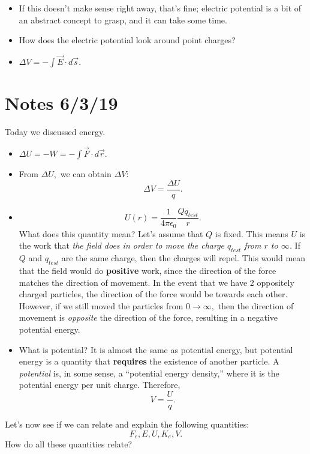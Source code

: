 \documentclass[12pt]{extreport}
\begin{document}
\begin{itemize}
\begin{itemize}
				\item If this doesn't make sense right away, that's fine; electric potential is a bit of an abstract concept to grasp, and it can take some time.

				\item How does the electric potential look around point charges?

				\item $\Delta V = -\int \vec E \cdot d\vec s.$

			\end{itemize}

	\end{itemize}

\section{Notes 6/3/19}
	Today we discussed energy. 
	\begin{itemize}
		\item $\Delta U = -W = -\int \vec F \cdot d \vec r.$
		\item From $\Delta U,$ we can obtain $\Delta V:$ $$\Delta V = \frac{\Delta U}{q}.$$

		\item $$U(r) = \frac{1}{4 \pi \epsilon_0} \frac{Q q_{test}}{r}.$$ What does this quantity mean? Let's assume that $Q$ is fixed. This means $U$ is the work that \textit{the field does in order to move the charge $q_{test}$ from $r$ to $\infty$.} If $Q$ and $q_{test}$ are the same charge, then the charges will repel. This would mean that the field would do \textbf{positive} work, since the direction of the force matches the direction of movement. In the event that we have 2 oppositely charged particles, the direction of the force would be towards each other. However, if we still moved the particles from $0 \rightarrow \infty,$ then the direction of movement is \textit{opposite} the direction of the force, resulting in a negative potential energy.

		\item What is potential? It is almost the same as potential energy, but potential energy is a quantity that \textbf{requires} the existence of another particle. A \textit{potential} is, in some sense, a ``potential energy density,'' where it is the potential energy per unit charge. Therefore, $$V = \frac{U}{q}.$$
	\end{itemize}

	Let's now see if we can relate and explain the following quantities: $$F_e, E, U, K_e, V.$$ How do all these quantities relate?
\end{document}

